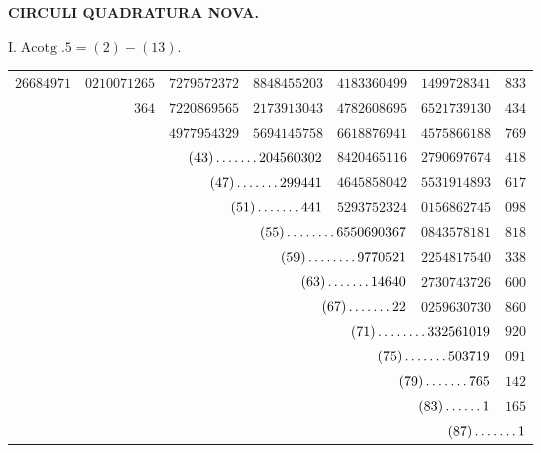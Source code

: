 \clearpage
\renewcommand{\BookRunningTitle}{Circuli quadratura nova}
%
\begin{center}\textbf{CIRCULI QUADRATURA NOVA.}\end{center}
\begin{center}I.\quad $\operatorname{Acotg}.5=(2)-(13).$\end{center}
\begingroup\fontsize{8.5}{11}\selectfont\setlength{\tabcolsep}{2pt}
\begin{longtable}{@{}rrrrrrr@{}}
\hline
$26684971$ & $0210071265$ & $7279572372$ & $8848455203$ & $4183360499$ & $1499728341$ & $833$\\
 & $364$ & $7220869565$ & $2173913043$ & $4782608695$ & $6521739130$ & $434$\\
 &  & $4977954329$ & $5694145758$ & $6618876941$ & $4575866188$ & $769$\\
 &  & \multicolumn{2}{r}{$(43)\mathinner{.\,.\,.\,.\,.\,.\,.}204560302$} & $8420465116$ & $2790697674$ & $418$\\
 &  & \multicolumn{2}{r}{$(47)\mathinner{.\,.\,.\,.\,.\,.\,.}299441$} & $4645858042$ & $5531914893$ & $617$\\
 &  & \multicolumn{2}{r}{$(51)\mathinner{.\,.\,.\,.\,.\,.\,.}441$} & $5293752324$ & $0156862745$ & $098$\\
 &  &  & \multicolumn{2}{r}{$(55)\mathinner{.\,.\,.\,.\,.\,.\,.\,.}6550690367$} & $0843578181$ & $818$\\
 &  &  & \multicolumn{2}{r}{$(59)\mathinner{.\,.\,.\,.\,.\,.\,.\,.}9770521$} & $2254817540$ & $338$\\
 &  &  & \multicolumn{2}{r}{$(63)\mathinner{.\,.\,.\,.\,.\,.\,.}14640$} & $2730743726$ & $600$\\
 &  &  & \multicolumn{2}{r}{$(67)\mathinner{.\,.\,.\,.\,.\,.\,.}22$} & $0259630730$ & $860$\\
 &  &  &  & \multicolumn{2}{r}{$(71)\mathinner{.\,.\,.\,.\,.\,.\,.\,.}332561019$} & $920$\\
 &  &  &  & \multicolumn{2}{r}{$(75)\mathinner{.\,.\,.\,.\,.\,.\,.}503719$} & $091$\\
 &  &  &  & \multicolumn{2}{r}{$(79)\mathinner{.\,.\,.\,.\,.\,.\,.}765$} & $142$\\
 &  &  &  & \multicolumn{2}{r}{$(83)\mathinner{.\,.\,.\,.\,.\,.}1$} & $165$\\
 &  &  &  &  & \multicolumn{2}{r}{$(87)\mathinner{.\,.\,.\,.\,.\,.\,.}1$}\\

\end{longtable}
